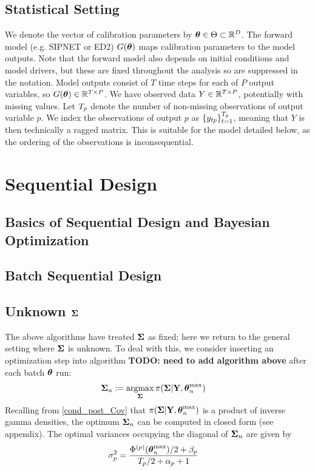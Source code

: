 \documentclass[12pt]{article}
\begin{document}
\subsection{Statistical Setting}
We denote the vector of calibration parameters by $\boldsymbol{\theta} \in \Theta \subset \mathbb{R}^{D}$. The forward model (e.g. SIPNET or ED2) $G(\boldsymbol{\theta})$ maps calibration parameters to the model outputs. Note that the forward 
model also depends on initial conditions and model drivers, but these are fixed throughout the analysis so are suppressed in the notation. Model outputs consist 
of $T$ time steps for each of $P$ output variables, so $G(\boldsymbol{\theta}) \in \mathbb{R}^{T \times P}$. We have observed data $Y \in \mathbb{R}^{T \times P}$, potentially with missing values. Let $T_{p}$ denote the number 
of non-missing observations of output variable $p$. We index the observations of output $p$ as $\{y_{tp}\}_{t = 1}^{T_{p}}$, meaning that $Y$ is then technically a ragged matrix. 
This is suitable for the model detailed below, as the ordering of the observations is inconsequential. 


\section{Sequential Design}

\subsection{Basics of Sequential Design and Bayesian Optimization}

\subsection{Batch Sequential Design}

\subsection{Unknown $\boldsymbol{\Sigma}$}
The above algorithms have treated $\boldsymbol{\Sigma}$ as fixed; here we return to the general setting where $\boldsymbol{\Sigma}$ is unknown. To deal with this, we consider inserting an 
optimization step into algorithm \textbf{TODO: need to add algorithm above} after each batch $\boldsymbol{\theta}$ run:
\begin{align}
\boldsymbol{\Sigma}_{n} &:= \operatorname*{argmax}_{\boldsymbol{\Sigma}} \pi(\boldsymbol{\Sigma}|\mathbf{Y}, \boldsymbol{\theta}_{n}^{\text{max}}) \label{Cov_optimization}
\end{align}
Recalling from \ref{cond_post_Cov} that $\pi(\boldsymbol{\Sigma}|\mathbf{Y}, \boldsymbol{\theta}_{n}^{\text{max}})$ is a product of inverse gamma densities, the optimum $\boldsymbol{\Sigma}_{n}$ can 
be computed in closed form (see appendix). The optimal variances occupying the diagonal of $\boldsymbol{\Sigma}_{n}$ are given by 
\begin{align}
\sigma_{p}^2 &= \frac{\Phi^{(p)}(\boldsymbol{\theta}_{n}^{\text{max}})/2 + \beta_{p}}{T_{p}/2 + \alpha_{p} + 1}
\end{align}
\end{document}
